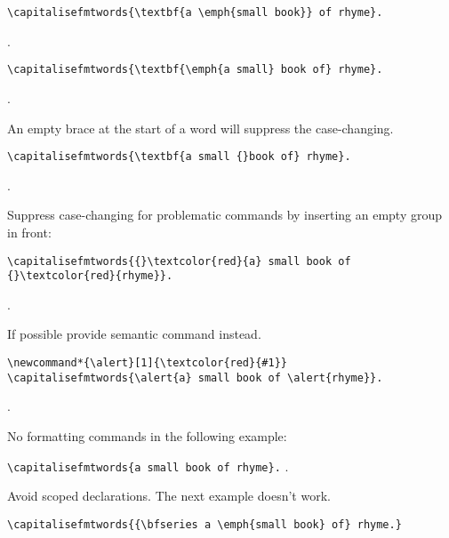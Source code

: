 \documentclass{article}
\begin{document}
\begin{verbatim}
\capitalisefmtwords{\textbf{a \emph{small book}} of rhyme}.
\end{verbatim}
.

\begin{verbatim}
\capitalisefmtwords{\textbf{\emph{a small} book of} rhyme}.
\end{verbatim}
.

\medskip

An empty brace at the start of a word will suppress the
case-changing.

\begin{verbatim}
\capitalisefmtwords{\textbf{a small {}book of} rhyme}.
\end{verbatim}
.

\medskip

Suppress case-changing for problematic commands by inserting
an empty group in front:

\begin{verbatim}
\capitalisefmtwords{{}\textcolor{red}{a} small book of
{}\textcolor{red}{rhyme}}.
\end{verbatim}
.

\medskip

If possible provide semantic command instead.

\begin{verbatim}
\newcommand*{\alert}[1]{\textcolor{red}{#1}}
\capitalisefmtwords{\alert{a} small book of \alert{rhyme}}.
\end{verbatim}
\newcommand*{\alert}[1]{\textcolor{red}{#1}}
\capitalisefmtwords{\alert{a} small book of \alert{rhyme}}.

\medskip

No formatting commands in the following example:

\verb|\capitalisefmtwords{a small book of rhyme}.|
.

\medskip

Avoid scoped declarations. The next example doesn't work.

\begin{verbatim}
\capitalisefmtwords{{\bfseries a \emph{small book} of} rhyme.}
\end{verbatim}
\end{document}
